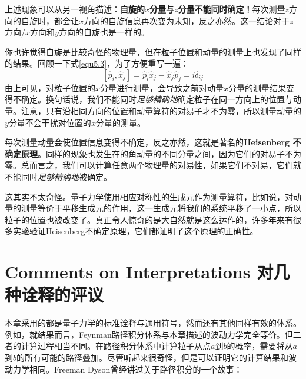 上述现象可以从另一视角描述：{\bf 自旋的$x$分量与$z$分量不能同时确定！}每次测量$z$方向的自旋时，都会让$x$方向的自旋信息再次变为未知，反之亦然。这一结论对于$z$ 方向/$x$方向和$y$方向的自旋也是一样的。

你也许觉得自旋是比较奇怪的物理量，但在粒子位置和动量的测量上也发现了同样的结果。回顾一下式\eqref{equ5.3}，为了方便重写一遍：
\begin{equation}
\label{equ8.16}
	[\hat p_i,\hat x_j]=\hat p_i \hat x_j - \hat x_j \hat p_j =i \delta_{ij}
\end{equation}
由上可见，对粒子位置的$x$分量进行测量，会导致之前对动量$x$分量的测量结果变得不确定。换句话说，我们不能同时{\it 足够精确地}确定粒子在同一方向上的位置与动量。注意，只有沿相同方向的位置和动量算符的对易子才不为零，所以测量动量的$y$分量不会干扰对位置的$x$分量的测量。

每次测量动量会使位置信息变得不确定，反之亦然，这就是著名的{\bf Heisenberg 不确定原理}。同样的现象也发生在的角动量的不同分量之间，因为它们的对易子不为零。总而言之，我们可以计算任意两个物理量的对易性，如果它们不对易，它们就不能同时{\it 足够精确地}被确定。

这其实不太奇怪。量子力学使用相应对称性的生成元作为测量算符，比如说，对动量的测量等价于平移生成元的作用，这一生成元将我们的系统平移了一小点，所以粒子的位置也被改变了。真正令人惊奇的是大自然就是这么运作的，许多年来有很多实验验证Heisenberg不确定原理，它们都证明了这个原理的正确性。



\section[对几种诠释的评议]{Comments on Interpretations \quad 对几种诠释的评议}\label{sec8.7}
本章采用的都是量子力学的标准诠释与通用符号，然而还有其他同样有效的体系。例如，就结果而言，Feynman路径积分体系与本章描述的波动力学完全等价。但二者的计算过程相当不同。在路径积分体系中计算粒子从点$a$到$b$的概率，需要将从$a$到$b$的所有可能的路径叠加。尽管听起来很奇怪，但是可以证明它的计算结果和波动力学相同。Freeman Dyson曾经讲过关于路径积分的一个故事：

